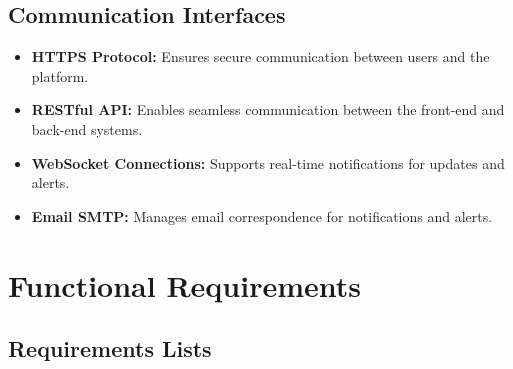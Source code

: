 \subsection{Communication Interfaces}
\label{subsec:communication_interfaces}%

\begin{itemize}
    \item \textbf{HTTPS Protocol:} Ensures secure communication between users and the platform.
    \item \textbf{RESTful API:} Enables seamless communication between the front-end and back-end systems.
    \item \textbf{WebSocket Connections:} Supports real-time notifications for updates and alerts.
    \item \textbf{Email SMTP:} Manages email correspondence for notifications and alerts.
\end{itemize}

\section{Functional Requirements}
\label{sec:functional_requirements}%

\subsection{Requirements Lists}
\label{subsec:requirements3}%
\setcounter{req}{1}
\newcommand{\creq}{\thereq\stepcounter{req}}


